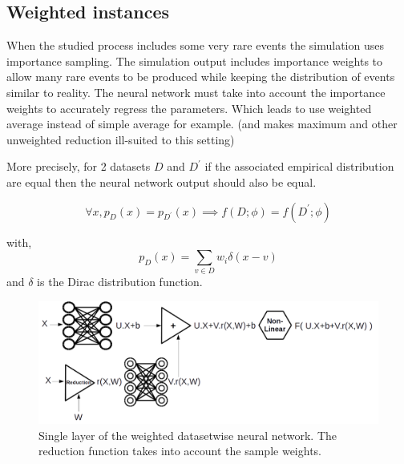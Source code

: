 

\subsection{Weighted instances} %
\label{sub:weighted_instances}


When the studied process includes some very rare events the simulation uses importance sampling. 
The simulation output includes importance weights to allow many rare events to be produced while keeping the distribution of events similar to reality.
The neural network must take into account the importance weights to accurately regress the parameters.
Which leads to use weighted average instead of simple average for example. (and makes maximum and other unweighted reduction ill-suited to this setting)

More precisely, for 2 datasets $D$ and $D^\prime$ if the associated empirical distribution are equal then the neural network output should also be equal.

\begin{equation}
    \forall x, p_D(x) = p_{D^\prime}(x) \implies f(D; \phi) = f(D^\prime; \phi)
\end{equation}

with,
\begin{equation}
    p_D(x) = \sum_{v \in D} w_i \delta (x - v)
\end{equation}
and $\delta$ is the Dirac distribution function.




\begin{figure}[htb]
    \includegraphics[width=\linewidth]{weighted_average_layer}
    \caption{Single layer of the weighted datasetwise neural network. The reduction function takes into account the sample weights.}
    \label{fig:weighted_average_layer}
\end{figure}


